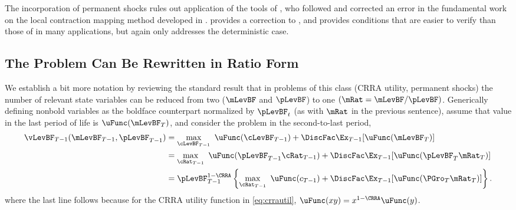 \documentclass[BufferStockTheory]{subfiles}
\begin{document}
The incorporation of permanent shocks rules out application of the tools of \cite{mnUnique}, who followed and corrected an error in the fundamental work on the local contraction mapping method developed in \cite{rrExistence}.  \cite{mvExistence} provides a correction to \cite{rrExistence}, and provides conditions that are easier to verify than those of \cite{rrExistence} in many applications, but again only addresses the deterministic case.  

\hypertarget{The-Problem-Can-Be-Rewritten-in-Ratio-Form}{}
\subsection{The Problem Can Be Rewritten in Ratio Form}

\label{subsec:ratio}

We establish a bit more notation by reviewing the standard result that in problems of this class (CRRA utility, permanent shocks) the number of relevant state variables can be reduced from two ($\mLevBF$ and $\pLevBF$) to one $(\mRat = \mLevBF/\pLevBF)$.  Generically defining nonbold variables as the boldface counterpart normalized by $\pLevBF_{t}$ (as with $\mRat$ in the previous sentence), assume that value in the last period of life is $\uFunc(\mLevBF_{T})$, and consider the problem in the second-to-last period,
\begin{align}
  \vLevBF_{T-1}(\mLevBF_{T-1},\pLevBF_{T-1})  & = 
                                                \max_{\cLevBF_{T-1}}~ \uFunc(\cLevBF_{T-1}) +\DiscFac \Ex_{T-1} [ \uFunc(\mLevBF_{T})]
                                                \notag \\
                                              & =  \max_{\cRat_{T-1}}~
                                                \uFunc(\pLevBF_{T-1}\cRat_{T-1}) + \DiscFac  \Ex_{T-1} [\uFunc(\pLevBF_{T}{\mRat}
                                                _{T})]  \notag \\
                                              & = \pLevBF_{T-1}^{1-\CRRA}
                                                \left\{\max_{\cRat_{T-1}}~ \uFunc(c_{T-1}) + \DiscFac \Ex_{T-1} [ \uFunc( {\PGro}_{T}
                                                {\mRat}_{T}) ] \right\}  . \label{eq:vBold}
\end{align}
where the last line follows because for the CRRA utility function in \eqref{eq:crrautil}, $\uFunc(xy) =
x^{1-\CRRA}\uFunc(y)$.
\end{document}
